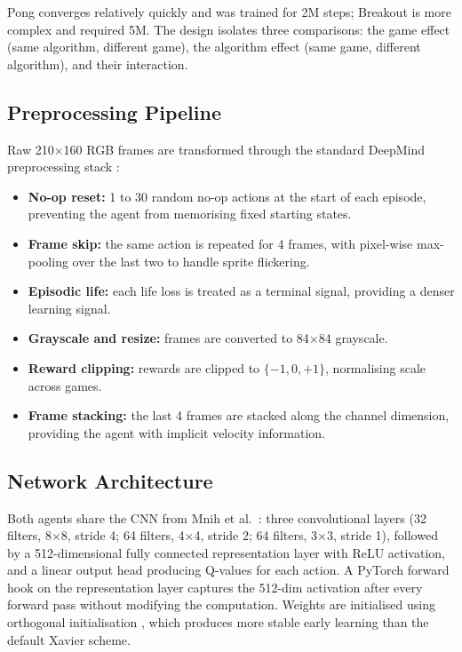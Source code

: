 \documentclass[a4paper]{article}
\begin{document}
Pong converges relatively quickly and was trained for 2M steps; Breakout is more complex and required 5M. The design isolates three comparisons: the game effect (same algorithm, different game), the algorithm effect (same game, different algorithm), and their interaction.

\subsection{Preprocessing Pipeline}

Raw 210$\times$160 RGB frames are transformed through the standard DeepMind preprocessing stack \cite{mnih2015human}:
\begin{itemize}
    \item \textbf{No-op reset:} 1 to 30 random no-op actions at the start of each episode, preventing the agent from memorising fixed starting states.
    \item \textbf{Frame skip:} the same action is repeated for 4 frames, with pixel-wise max-pooling over the last two to handle sprite flickering.
    \item \textbf{Episodic life:} each life loss is treated as a terminal signal, providing a denser learning signal.
    \item \textbf{Grayscale and resize:} frames are converted to 84$\times$84 grayscale.
    \item \textbf{Reward clipping:} rewards are clipped to $\{-1, 0, +1\}$, normalising scale across games.
    \item \textbf{Frame stacking:} the last 4 frames are stacked along the channel dimension, providing the agent with implicit velocity information.
\end{itemize}

\subsection{Network Architecture}

Both agents share the CNN from Mnih et al.\ \cite{mnih2015human}: three convolutional layers (32 filters, 8$\times$8, stride 4; 64 filters, 4$\times$4, stride 2; 64 filters, 3$\times$3, stride 1), followed by a 512-dimensional fully connected representation layer with ReLU activation, and a linear output head producing Q-values for each action. A PyTorch forward hook on the representation layer captures the 512-dim activation after every forward pass without modifying the computation. Weights are initialised using orthogonal initialisation \cite{saxe2013exact}, which produces more stable early learning than the default Xavier scheme.
\end{document}
